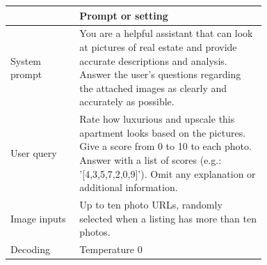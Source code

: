\begin{tabular}{lp{0.73\linewidth}}
\toprule
 & Prompt or setting \\
\midrule
System prompt & You are a helpful assistant that can look at pictures of real estate and provide accurate descriptions and analysis. Answer the user's questions regarding the attached images as clearly and accurately as possible. \\
User query & Rate how luxurious and upscale this apartment looks based on the pictures. Give a score from 0 to 10 to each photo. Answer with a list of scores (e.g.: '[4,3,5,7,2,0,9]'). Omit any explanation or additional information. \\
Image inputs & Up to ten photo URLs, randomly selected when a listing has more than ten photos. \\
Decoding & Temperature 0 \\
\bottomrule
\end{tabular}
